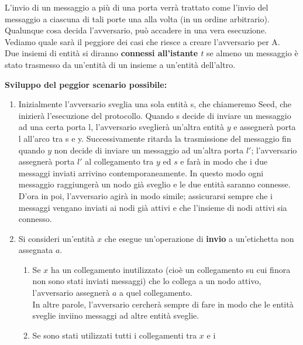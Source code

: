 L'invio di un messaggio a più di una porta verrà trattato come l'invio del
messaggio a ciascuna di tali porte una alla volta (in un ordine arbitrario).\\
Qualunque cosa decida l'avversario, può accadere in una vera esecuzione.
Vediamo quale sarà il peggiore dei casi che riesce a creare l'avversario per A.\\

Due insiemi di entità si diranno \textbf{connessi all'istante $t$} se almeno un
messaggio è stato trasmesso da un'entità di un insieme a un'entità dell'altro.

\textbf{Sviluppo del peggior scenario possibile:}
\begin{enumerate}
    \item Inizialmente l'avversario sveglia una sola entità s, che chiameremo
          Seed, che inizierà l'esecuzione del protocollo. Quando s decide di
          inviare un messaggio ad una certa porta l, l'avversario sveglierà
          un'altra entità $y$ e assegnerà porta l all'arco tra s e y.
          Successivamente ritarda la trasmissione del messaggio fin quando $y$
          non decide di inviare un messaggio ad un'altra porta $l'$;
          l'avversario assegnerà porta $l'$ al collegamento tra $y$ ed $s$ e
          farà in modo che i due messaggi inviati arrivino contemporaneamente.
          In questo modo ogni messaggio raggiungerà un nodo già sveglio e le due
          entità saranno connesse.\\
          D'ora in poi, l'avversario agirà in modo simile; assicurarsi sempre
          che i messaggi vengano inviati ai nodi già attivi e che l'insieme di
          nodi attivi sia connesso.
    \item Si consideri un'entità $x$ che esegue un'operazione di \textbf{invio}
          a un'etichetta non assegnata $a$.
          \begin{enumerate}
              \item Se $x$ ha un collegamento inutilizzato (cioè un collegamento
                    su cui finora non sono stati inviati messaggi) che lo
                    collega a un nodo attivo, l'avversario assegnerà $a$ a quel
                    collegamento.\\
                    In altre parole, l'avversario cercherà sempre di fare in
                    modo che le entità sveglie inviino messaggi ad altre entità
                    sveglie.
              \item Se sono stati utilizzati tutti i collegamenti tra $x$ e i

\end{enumerate}
\end{enumerate}
